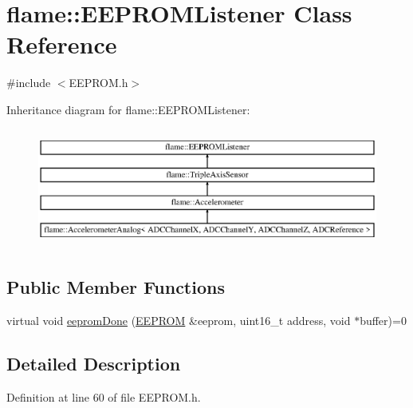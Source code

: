 \hypertarget{classflame_1_1_e_e_p_r_o_m_listener}{\section{flame\-:\-:E\-E\-P\-R\-O\-M\-Listener Class Reference}
\label{classflame_1_1_e_e_p_r_o_m_listener}
}


{\ttfamily \#include $<$E\-E\-P\-R\-O\-M.\-h$>$}

Inheritance diagram for flame\-:\-:E\-E\-P\-R\-O\-M\-Listener\-:\begin{figure}[H]
\begin{center}
\leavevmode
\includegraphics[height=3.964602cm]{classflame_1_1_e_e_p_r_o_m_listener}
\end{center}
\end{figure}
\subsection*{Public Member Functions}
\begin{DoxyCompactItemize}
\item 
virtual void \hyperlink{classflame_1_1_e_e_p_r_o_m_listener_a676ba44ddf2c7927d1c60c017a807279}{eeprom\-Done} (\hyperlink{classflame_1_1_e_e_p_r_o_m}{E\-E\-P\-R\-O\-M} \&eeprom, uint16\-\_\-t address, void $\ast$buffer)=0
\end{DoxyCompactItemize}


\subsection{Detailed Description}


Definition at line 60 of file E\-E\-P\-R\-O\-M.\-h.




